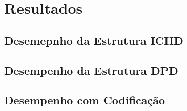  \chapter{Resultados} \label{capitulo5}

\section{Desemepnho da Estrutura ICHD}

\section{Desempenho da Estrutura DPD}

\section{Desempenho com Codificação}


